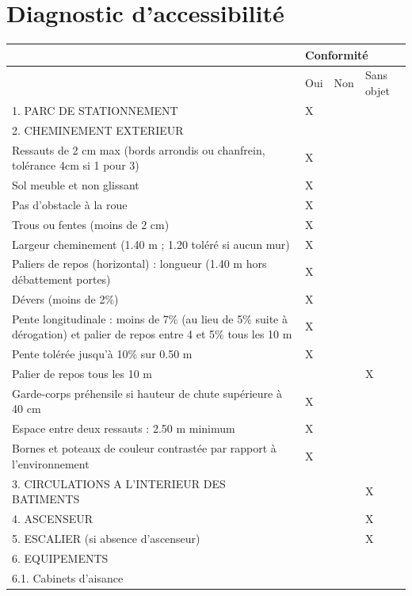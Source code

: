 \documentclass[hidelinks, paper=a4, fontsize=13pt]{report}
\begin{document}
\section{Diagnostic d’accessibilité}

\begin{center}
\begin{tabular}{ | p{13cm} | p{1cm} | p{1cm} | p{1cm} | }
\hline
	 & \multicolumn{3}{|l|}{Conformité}  \\ \hline
	 & Oui & Non & Sans objet \\ \hline
	1. PARC DE STATIONNEMENT & X &  &  \\ \hline
	2. CHEMINEMENT EXTERIEUR &  & \  & \  \\ \hline
	Ressauts de 2 cm max (bords arrondis ou chanfrein, tolérance 4cm si 1 pour 3) & X &  &  \\ \hline
	Sol meuble et non glissant & X &  &  \\ \hline
	Pas d’obstacle à la roue & X &  &  \\ \hline
	Trous ou fentes (moins de 2 cm) & X &  &  \\ \hline
	Largeur cheminement (1.40 m ; 1.20 toléré si aucun mur) & X &  &  \\ \hline
	Paliers de repos (horizontal) : longueur (1.40 m hors débattement portes) & X &  &  \\ \hline
	Dévers (moins de 2\%) & X &  &  \\ \hline
	Pente longitudinale : moins de 7\% (au lieu de 5\% suite à dérogation) et palier de repos entre 4 et 5\% tous les 10 m & X &  &  \\ \hline
	Pente tolérée jusqu’à 10\% sur 0.50 m & X &  &  \\ \hline
	Palier de repos tous les 10 m &  &  & X \\ \hline
	Garde-corps préhensile si hauteur de chute supérieure à 40 cm & X &  & \\ \hline
	Espace entre deux ressauts : 2.50 m minimum & X &  &  \\ \hline
	Bornes et poteaux de couleur contrastée par rapport à l’environnement & X &  &  \\ \hline
	3. CIRCULATIONS A L’INTERIEUR DES BATIMENTS &  &  & X \\ \hline
	4. ASCENSEUR &  &  & X \\ \hline
	5. ESCALIER (si absence d’ascenseur) &  &  & X \\ \hline
	6. EQUIPEMENTS &  & \  & \  \\ \hline
	6.1. Cabinets d’aisance &  & \  & \  \\ \hline

\end{tabular}
\end{center}
\end{document}
